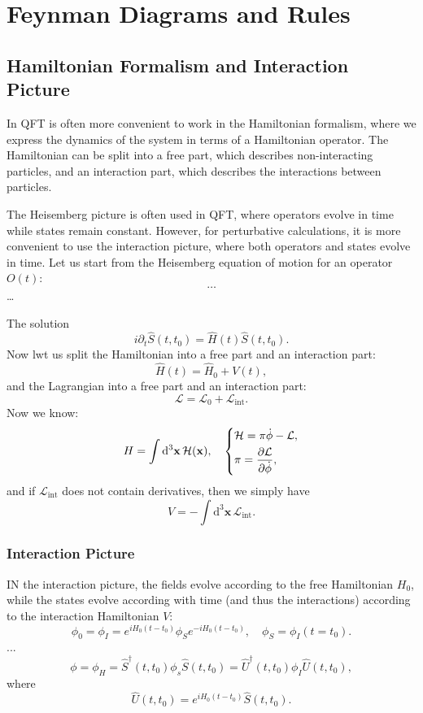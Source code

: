 \chapter{Feynman Diagrams and Rules}


\section{Hamiltonian Formalism and Interaction Picture}

In QFT is often more convenient to work in the Hamiltonian formalism, where we express the dynamics of the system in terms of a Hamiltonian operator. The Hamiltonian can be split into a free part, which describes non-interacting particles, and an interaction part, which describes the interactions between particles.

The Heisemberg picture is often used in QFT, where operators evolve in time while states remain constant. However, for perturbative calculations, it is more convenient to use the interaction picture, where both operators and states evolve in time. Let us start from the Heisemberg equation of motion for an operator \( O(t) \):
\[
    \dots
\]
\dots

The solution
\[
    i \partial_t \hat{S}(t, t_0) = \hat{H}(t) \hat{S}(t, t_0).
\]
Now lwt us split the Hamiltonian into a free part and an interaction part:
\[
    \hat{H}(t) = \hat{H}_0 + V(t),
\]
and the Lagrangian into a free part and an interaction part:
\[
    \mathcal{L} = \mathcal{L}_0 + \mathcal{L}_{\text{int}}.
\]
Now we know:
\[
    H = \int \mathrm{d}^3 \mathbf{x} \, \mathcal{H} (\mathbf{x}), \quad \begin{dcases}
        \mathcal{H} = \pi \dot{\phi} - \mathcal{L}, \\
        \pi = \frac{\partial \mathcal{L}}{\partial \dot{\phi}},
    \end{dcases}
\]
and if \(\mathcal{L}_{\text{int}} \) does not contain derivatives, then we simply have
\[
    V = - \int \mathrm{d}^3 \mathbf{x} \, \mathcal{L}_{\text{int}}.
\]

\subsection{Interaction Picture}

IN the interaction picture, the fields evolve according to the free Hamiltonian \(H_0\), while the states evolve according with time (and thus the interactions) according to the interaction Hamiltonian \(V\):
\[
    \phi_0 = \phi_I = e^{i H_0 (t-t_0)} \phi_S e^{-i H_0 (t-t_0)}, \quad \phi_S = \phi_I (t=t_0).
\]
...
\[
    \phi = \phi_H = \hat{S}^{\dagger}(t,t_0) \phi_s \hat{S}(t,t_0) = \hat{U}^{\dagger} (t,t_0) \phi_I \hat{U}(t,t_0),
\]
where
\[
    \hat{U}(t,t_0) = e^{i H_0 (t-t_0)} \hat{S}(t,t_0).
\]

